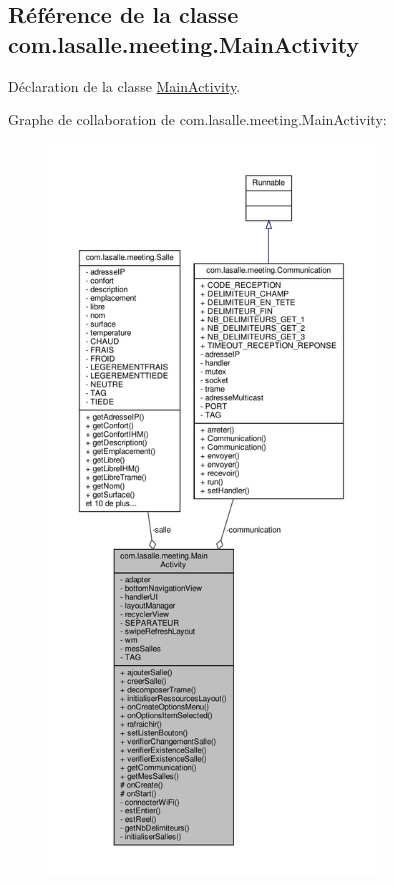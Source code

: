 \hypertarget{classcom_1_1lasalle_1_1meeting_1_1_main_activity}{}\subsection{Référence de la classe com.\+lasalle.\+meeting.\+Main\+Activity}
\label{classcom_1_1lasalle_1_1meeting_1_1_main_activity}


Déclaration de la classe \hyperlink{classcom_1_1lasalle_1_1meeting_1_1_main_activity}{Main\+Activity}.  




Graphe de collaboration de com.\+lasalle.\+meeting.\+Main\+Activity\+:
\nopagebreak
\begin{figure}[H]
\begin{center}
\leavevmode
\includegraphics[height=550pt]{classcom_1_1lasalle_1_1meeting_1_1_main_activity__coll__graph}
\end{center}
\end{figure}
